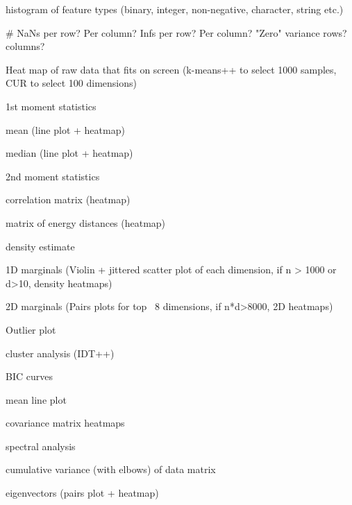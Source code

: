 \documentclass[simplex.tex]{subfiles}
\begin{document}
\begin{compactenum}
  \item histogram of feature types (binary, integer, non-negative, character, string etc.)
  \item \# NaNs per row? Per column? Infs per row? Per column? "Zero" variance rows? columns?
  \item Heat map of raw data that fits on screen (k-means++ to select 1000 samples, CUR to select 100 dimensions)
  \item 1st moment statistics
  \begin{compactenum}
    \item mean (line plot + heatmap)
    \item median (line plot + heatmap)
  \end{compactenum}
  \item 2nd moment statistics
  \begin{compactenum}
    \item correlation matrix (heatmap)
    \item matrix of energy distances (heatmap)
  \end{compactenum}
  \item density estimate
  \begin{compactenum}
    \item 1D marginals (Violin + jittered scatter plot of each dimension,  if n > 1000 or d>10, density heatmaps)
    \item 2D marginals (Pairs plots for top ~8 dimensions, if n*d>8000, 2D heatmaps)
  \end{compactenum}
  \item Outlier plot 
  \item cluster analysis (IDT++)
  \begin{compactenum}
    \item BIC curves
    \item mean line plot
    \item covariance matrix heatmaps
  \end{compactenum}
  \item spectral analysis
  \begin{compactenum}
    \item cumulative variance (with elbows) of data matrix
    \item eigenvectors (pairs plot + heatmap)
  \end{compactenum}
\end{compactenum}
\end{document}
